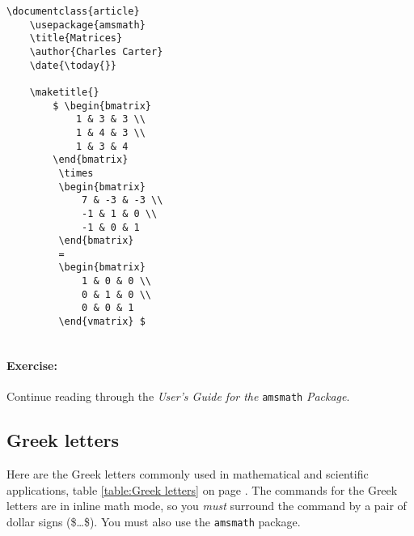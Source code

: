         \begin{verbatim}
\documentclass{article}
    \usepackage{amsmath}
    \title{Matrices}
    \author{Charles Carter}
    \date{\today{}}
 
    \maketitle{}
        $ \begin{bmatrix}
            1 & 3 & 3 \\
            1 & 4 & 3 \\
            1 & 3 & 4 
        \end{bmatrix}
         \times 
         \begin{bmatrix}
             7 & -3 & -3 \\
             -1 & 1 & 0 \\
             -1 & 0 & 1
         \end{bmatrix}
         =
         \begin{bmatrix}
             1 & 0 & 0 \\
             0 & 1 & 0 \\
             0 & 0 & 1
         \end{vmatrix} $
    
        \end{verbatim}

		\paragraph{Exercise:}Continue reading through the \textit{User's Guide for the }\texttt{amsmath} \textit{Package}.

        \subsection{Greek letters}
        \label{Greek letters}
        
        Here are the Greek letters commonly used in mathematical and scientific applications, table \ref{table:Greek letters} on page \pageref{table:Greek letters}. The \Lx{} commands for the Greek letters are in inline math mode, so you \textit{must} surround the command by a pair of dollar signs (\$\ldots\$). You must also use the \texttt{amsmath} package.

